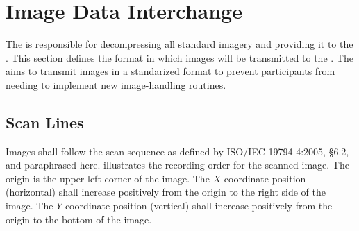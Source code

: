 \section{Image Data Interchange}
\label{sec:data-interchange}
The \testdriver is responsible for decompressing all standard imagery and
providing it to the \lib. This section defines the format in which images
will be transmitted to the \lib. The \testdriver aims to transmit images
in a standarized format to prevent participants from needing to implement new
image-handling routines.

\subsection{Scan Lines}
Images shall follow the scan sequence as defined by ISO/IEC 19794-4:2005, \S6.2,
and paraphrased here.  illustrates the recording order
for the scanned image. The origin is the upper left corner of the image. The
$X$-coordinate position (horizontal) shall increase positively from the origin
to the right side of the image. The $Y$-coordinate position (vertical) shall
increase positively from the origin to the bottom of the image.

